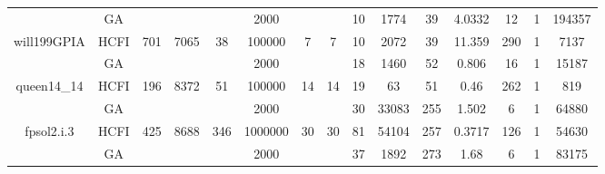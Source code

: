 \documentclass[10pt]{article}
\begin{document}
\begin{center}
\begin{table}[H]
\begin{tabular}{|c|c|c|c|c|c|c|c|c|c|c|c|c|c|c|}
	&GA&       &                   &                     &    2000     &     \cellcolor{yellow} & {\cellcolor{yellow}}& {{\cellcolor{green}10}}
&1774   &39        & 4.0332                  &12                    &1          &194357        \\ \cline{2-2} \cline{6-6} \cline{9-15}
 \multirow{-2}{*}{will199GPIA} &HCFI   &\multirow{-2}{*}{701}   &\multirow{-2}{*}{7065}     &\multirow{-2}{*}{38}     &100000     &\multirow{-2}{*}{\cellcolor{yellow}7}      & \multirow{-2}{*}{\cellcolor{yellow}7}    &{\cellcolor{green}10}     & 2072        &39    &11.359         &290    &    1 &7137         \\ \hline \hline
	&GA&       &                   &                     &    2000     &     \cellcolor{yellow} & {\cellcolor{yellow}}& {{\cellcolor{green}18}}
&1460   &52        &0.806                   & 16                   &1          &15187         \\ \cline{2-2} \cline{6-6} \cline{9-15}
 \multirow{-2}{*}{queen14\_14} &HCFI   &\multirow{-2}{*}{196}   &\multirow{-2}{*}{8372}     &\multirow{-2}{*}{51}     &100000     &\multirow{-2}{*}{\cellcolor{yellow}14}      & \multirow{-2}{*}{\cellcolor{yellow}14}    &{\cellcolor{green}19}     &63         &51    &0.46         &262    &1     &819        \\ \hline \hline
	&GA&       &                   &                     &   2000      &     \cellcolor{yellow} & {\cellcolor{yellow}}& {{\cellcolor{green}30}}
&33083   &255        &1.502                   &6                    &1          &64880        \\ \cline{2-2} \cline{6-6} \cline{9-15}
 \multirow{-2}{*}{fpsol2.i.3} &HCFI   &\multirow{-2}{*}{425}   &\multirow{-2}{*}{8688}     &\multirow{-2}{*}{346}     &1000000      &\multirow{-2}{*}{\cellcolor{yellow}30}      & \multirow{-2}{*}{\cellcolor{yellow}30}    &{\cellcolor{green}81}     & 54104        &257    &0.3717          &126    &1     &54630        \\ \hline \hline
	&GA&       &                   &                     & 2000        &     \cellcolor{yellow} & {\cellcolor{yellow}}& {{\cellcolor{green}37}}
&1892   &273          & 1.68                   &6                    &1          &83175        \\ \cline{2-2} \cline{6-6} \cline{9-15}

\end{tabular}
\end{table}
\end{center}
\end{document}
